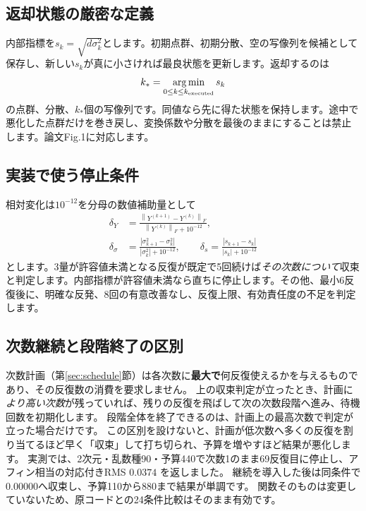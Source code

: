 \documentclass[a4paper,11pt]{article}
\newcommand{\argmin}{\operatorname*{arg\,min}}
\newcommand{\code}[1]{\texttt{\detokenize{#1}}}
\newcommand{\norm}[1]{\left\lVert#1\right\rVert}
\numberwithin{equation}{section}
\begin{document}
\subsection{返却状態の厳密な定義}
内部指標を\(s_k=\sqrt{d\sigma_k^2}\)とします。初期点群、初期分散、空の写像列を候補として保存し、新しい\(s_k\)が真に小さければ最良状態を更新します。返却するのは
\begin{equation}
 k_*=\argmin_{0\leq k\leq k_{\rm executed}}s_k
\end{equation}
の点群、分散、\(k_*\)個の写像列です。同値なら先に得た状態を保持します。途中で悪化した点群だけを巻き戻し、変換係数や分散を最後のままにすることは禁止します。論文Fig.1に対応します。\cite{acpd}

\subsection{実装で使う停止条件}
相対変化は\(10^{-12}\)を分母の数値補助量として
\begin{align}
 \delta_Y&=\frac{\norm{Y^{(k+1)}-Y^{(k)}}_F}{\norm{Y^{(k)}}_F+10^{-12}},\\
 \delta_\sigma&=\frac{|\sigma_{k+1}^2-\sigma_k^2|}{|\sigma_k^2|+10^{-12}},\qquad
 \delta_s=\frac{|s_{k+1}-s_k|}{|s_k|+10^{-12}}
\end{align}
とします。3量が許容値未満となる反復が既定で5回続けば\emph{その次数について}収束と判定します。内部指標が許容値未満なら直ちに停止します。その他、最小6反復後に、明確な反発、8回の有意改善なし、反復上限、有効責任度の不足を判定します。

\subsection{次数継続と段階終了の区別}\label{sec:continuation}
次数計画（第\ref{sec:schedule}節）は各次数に\textbf{最大で}何反復使えるかを与えるものであり、その反復数の消費を要求しません。
上の収束判定が立ったとき、計画に\emph{より高い次数}が残っていれば、残りの反復を飛ばして次の次数段階へ進み、待機回数を初期化します。
段階全体を終了できるのは、計画上の最高次数で判定が立った場合だけです。
この区別を設けないと、計画が低次数へ多くの反復を割り当てるほど早く「収束」して打ち切られ、予算を増やすほど結果が悪化します。
実測では、2次元・乱数種90・予算440で次数1のまま69反復目に停止し、アフィン相当の対応付きRMS \(0.0374\) を返しました。
継続を導入した後は同条件で\(0.00000\)へ収束し、予算110から880まで結果が単調です。
\code{degree\_schedule}関数そのものは変更していないため、原コードとの24条件比較はそのまま有効です。
\end{document}

